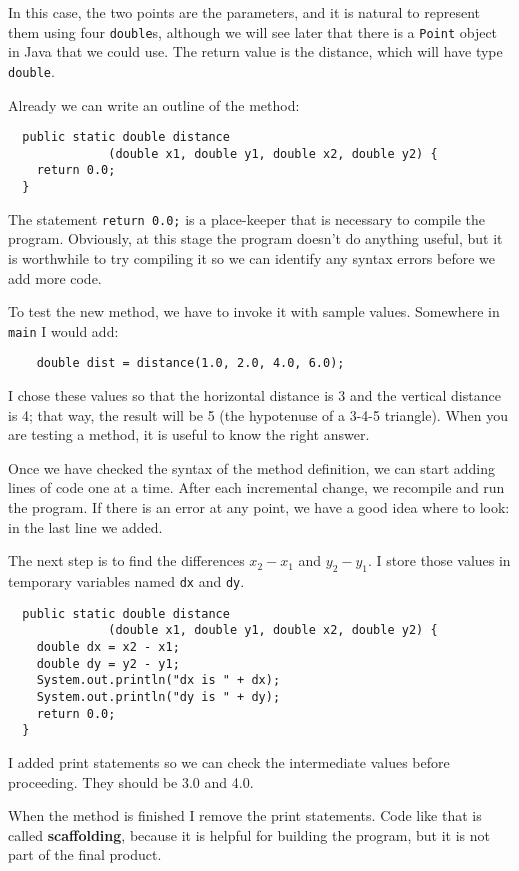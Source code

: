 \documentclass[12pt]{book}
\theoremstyle{definition}
\begin{document}
In this case, the two points are the parameters, and it is
natural to represent them using four {\tt double}s, although
we will see later that there is a {\tt Point} object in Java
that we could use.  The return value is the distance, which
will have type {\tt double}.

Already we can write an outline of the method:

\begin{lstlisting}
  public static double distance
              (double x1, double y1, double x2, double y2) {
    return 0.0;
  }
\end{lstlisting}
%
The statement {\tt return 0.0;} is a place-keeper that is necessary
to compile the program.  Obviously, at this stage the
program doesn't do anything useful, but it is worthwhile to
try compiling it so we can identify any syntax errors before
we add more code.

To test the new method, we have to invoke it with
sample values.  Somewhere in {\tt main} I would add:

\begin{lstlisting}
    double dist = distance(1.0, 2.0, 4.0, 6.0);
\end{lstlisting}
%
I chose these values so that the horizontal
distance is 3 and the vertical distance is 4; that way,
the result will be 5 (the hypotenuse of a 3-4-5 triangle).
When you are testing a method, it is useful to know the right
answer.

Once we have checked the syntax of the method definition, we
can start adding lines of code one at a time.  After each
incremental change, we recompile and run the program.  If there is
an error at any point, we have a good idea where to look:
in the last line we added.

The next step is to find the differences
$x_2 - x_1$ and $y_2 - y_1$.  I store those values in
temporary variables named {\tt dx} and {\tt dy}.

\begin{lstlisting}
  public static double distance
              (double x1, double y1, double x2, double y2) {
    double dx = x2 - x1;
    double dy = y2 - y1;
    System.out.println("dx is " + dx);
    System.out.println("dy is " + dy);
    return 0.0;
  }
\end{lstlisting}
%
I added print statements so we can check the intermediate values
before proceeding.  They should be 3.0 and 4.0.


When the method is finished I remove the print statements.  Code
like that is called {\bf scaffolding}, because it is helpful for
building the program, but it is not part of the final product.
\end{document}
